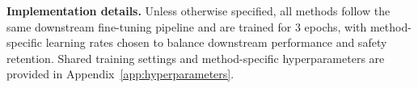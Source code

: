 \documentclass{article}
\newcommand{\kms}[1]{{\leavevmode\color{blue}[MS: #1]}}
\newcommand{\wjb}[1]{{\leavevmode\color{orange}[jb: #1]}}
\begin{document}

\textbf{Implementation details.}
Unless otherwise specified, all methods follow the same downstream fine-tuning pipeline and are trained for 3 epochs, with method-specific learning rates chosen to balance downstream performance and safety retention. %
Shared training settings and method-specific hyperparameters are provided in Appendix~\ref{app:hyperparameters}.







\end{document}
